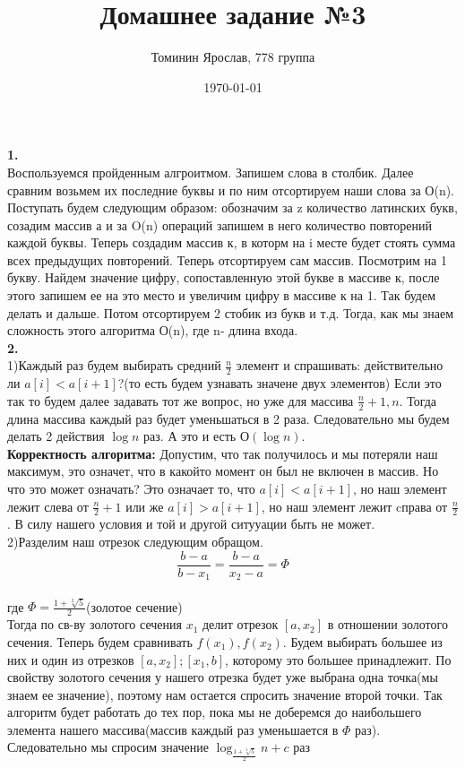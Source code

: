 \documentclass[a4paper,12pt]{article}
\author{Томинин Ярослав, 778 группа}
\title{Домашнее задание №3}
\date{\today}
\begin{document}
 

\maketitle
\newpage
\textbf{1.}\\
Воспользуемся пройденным алгроитмом. Запишем слова в столбик. Далее сравним возьмем их последние буквы и по ним отсортируем наши слова за О(n). Поступать будем следующим образом: обозначим за z количество латинских букв, созадим массив а и за O(n) операций запишем в него количество повторений каждой буквы. Теперь создадим массив к, в которм на i месте будет стоять сумма всех предыдущих повторений. Теперь отсортируем сам массив. Посмотрим на 1 букву. Найдем значение цифру, сопоставленную этой букве в массиве к, после этого запишем ее на это место и увеличим цифру в массиве к на 1. Так будем делать и дальше. Потом отсортируем 2 стобик из букв и т.д. Тогда, как мы знаем сложность этого алгоритма О(n), где n- длина входа.\\
\textbf{2.}\\
1)Каждый раз будем выбирать средний $\frac{n}{2}$ элемент  и спрашивать: действительно ли $a[i]<a[i+1]$?(то есть будем узнавать значене двух элементов) Если это так то будем далее задавать тот же вопрос, но уже для массива $\frac{n}{2}+1, n$. Тогда длина массива каждый раз будет уменьшаться в 2 раза. Следовательно мы будем делать 2 действия $\log n$ раз. А это и есть $О(\log n)$.\\
\textbf{Корректность алгоритма:} Допустим, что так получилось и мы потеряли наш максимум, это означет, что в какойто момент он был не включен в массив. Но что это может означать? Это означает то, что $a[i]<a[i+1]$, но наш элемент лежит слева от $\frac{n}{2}+1$ или же $a[i]>a[i+1]$, но наш элемент лежит cправа от $\frac{n}{2}$. В силу нашего условия и той и другой ситууации быть не может.\\
2)Разделим наш отрезок следующим обращом.
\[\frac{b-a}{b-x_1}=\frac{b-a}{x_2-a}=\Phi\]\\
где $\Phi=\frac{1+\sqrt[2]{5}}{2}$(золотое сечение)\\
Тогда по св-ву золотого сечения $x_1$ делит отрезок $[a,x_2]$ в отношении золотого сечения. Теперь будем сравнивать $f(x_1),f(x_2)$. Будем выбирать большее из них и один из отрезков $[a,x_2];[x_1,b]$, которому это большее принадлежит. По свойству золотого сечения у нашего отрезка будет уже выбрана одна точка(мы знаем ее значение), поэтому нам остается спросить значение второй точки. Так алгоритм будет работать до тех пор, пока мы не доберемся до наибольшего элемента нашего массива(массив каждый раз уменьшается в $\Phi$ раз). Следовательно мы спросим значение  $\log_{\frac{1+\sqrt[2]{5}}{2}} n +c$ раз\\
\end{document}
